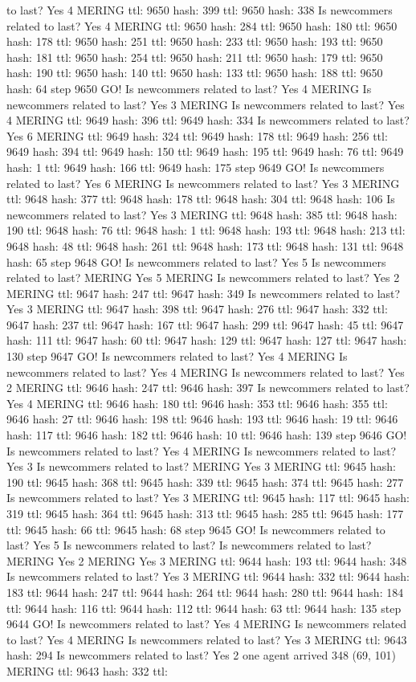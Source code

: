 to last? Yes 4 MERING ttl: 9650 hash: 399 ttl: 9650 hash: 338 Is newcommers related to last? Yes 4 MERING ttl: 9650 hash: 284 ttl: 9650 hash: 180 ttl: 9650 hash: 178 ttl: 9650 hash: 251 ttl: 9650 hash: 233 ttl: 9650 hash: 193 ttl: 9650 hash: 181 ttl: 9650 hash: 254 ttl: 9650 hash: 211 ttl: 9650 hash: 179 ttl: 9650 hash: 190 ttl: 9650 hash: 140 ttl: 9650 hash: 133 ttl: 9650 hash: 188 ttl: 9650 hash: 64 step 9650 GO! Is newcommers related to last? Yes 4 MERING Is newcommers related to last? Yes 3 MERING Is newcommers related to last? Yes 4 MERING ttl: 9649 hash: 396 ttl: 9649 hash: 334 Is newcommers related to last? Yes 6 MERING ttl: 9649 hash: 324 ttl: 9649 hash: 178 ttl: 9649 hash: 256 ttl: 9649 hash: 394 ttl: 9649 hash: 150 ttl: 9649 hash: 195 ttl: 9649 hash: 76 ttl: 9649 hash: 1 ttl: 9649 hash: 166 ttl: 9649 hash: 175 step 9649 GO! Is newcommers related to last? Yes 6 MERING Is newcommers related to last? Yes 3 MERING ttl: 9648 hash: 377 ttl: 9648 hash: 178 ttl: 9648 hash: 304 ttl: 9648 hash: 106 Is newcommers related to last? Yes 3 MERING ttl: 9648 hash: 385 ttl: 9648 hash: 190 ttl: 9648 hash: 76 ttl: 9648 hash: 1 ttl: 9648 hash: 193 ttl: 9648 hash: 213 ttl: 9648 hash: 48 ttl: 9648 hash: 261 ttl: 9648 hash: 173 ttl: 9648 hash: 131 ttl: 9648 hash: 65 step 9648 GO! Is newcommers related to last? Yes 5 Is newcommers related to last? MERING Yes 5 MERING Is newcommers related to last? Yes 2 MERING ttl: 9647 hash: 247 ttl: 9647 hash: 349 Is newcommers related to last? Yes 3 MERING ttl: 9647 hash: 398 ttl: 9647 hash: 276 ttl: 9647 hash: 332 ttl: 9647 hash: 237 ttl: 9647 hash: 167 ttl: 9647 hash: 299 ttl: 9647 hash: 45 ttl: 9647 hash: 111 ttl: 9647 hash: 60 ttl: 9647 hash: 129 ttl: 9647 hash: 127 ttl: 9647 hash: 130 step 9647 GO! Is newcommers related to last? Yes 4 MERING Is newcommers related to last? Yes 4 MERING Is newcommers related to last? Yes 2 MERING ttl: 9646 hash: 247 ttl: 9646 hash: 397 Is newcommers related to last? Yes 4 MERING ttl: 9646 hash: 180 ttl: 9646 hash: 353 ttl: 9646 hash: 355 ttl: 9646 hash: 27 ttl: 9646 hash: 198 ttl: 9646 hash: 193 ttl: 9646 hash: 19 ttl: 9646 hash: 117 ttl: 9646 hash: 182 ttl: 9646 hash: 10 ttl: 9646 hash: 139 step 9646 GO! Is newcommers related to last? Yes 4 MERING Is newcommers related to last? Yes 3 Is newcommers related to last? MERING Yes 3 MERING ttl: 9645 hash: 190 ttl: 9645 hash: 368 ttl: 9645 hash: 339 ttl: 9645 hash: 374 ttl: 9645 hash: 277 Is newcommers related to last? Yes 3 MERING ttl: 9645 hash: 117 ttl: 9645 hash: 319 ttl: 9645 hash: 364 ttl: 9645 hash: 313 ttl: 9645 hash: 285 ttl: 9645 hash: 177 ttl: 9645 hash: 66 ttl: 9645 hash: 68 step 9645 GO! Is newcommers related to last? Yes 5 Is newcommers related to last? Is newcommers related to last? MERING Yes 2 MERING Yes 3 MERING ttl: 9644 hash: 193 ttl: 9644 hash: 348 Is newcommers related to last? Yes 3 MERING ttl: 9644 hash: 332 ttl: 9644 hash: 183 ttl: 9644 hash: 247 ttl: 9644 hash: 264 ttl: 9644 hash: 280 ttl: 9644 hash: 184 ttl: 9644 hash: 116 ttl: 9644 hash: 112 ttl: 9644 hash: 63 ttl: 9644 hash: 135 step 9644 GO! Is newcommers related to last? Yes 4 MERING Is newcommers related to last? Yes 4 MERING Is newcommers related to last? Yes 3 MERING ttl: 9643 hash: 294 Is newcommers related to last? Yes 2 one agent arrived 348 (69, 101) MERING ttl: 9643 hash: 332 ttl: 